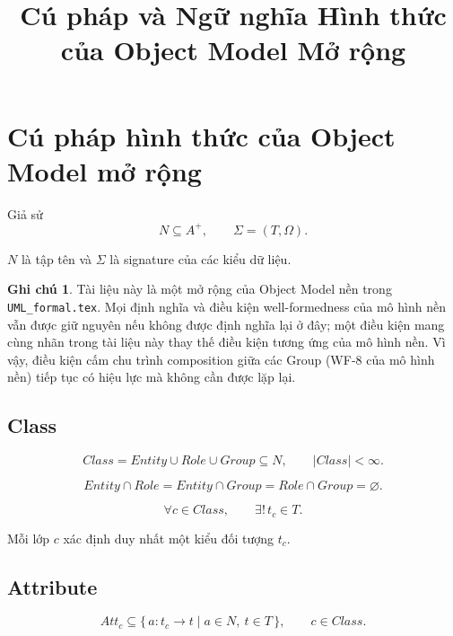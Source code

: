 \documentclass[12pt,a4paper]{article}
\title{Cú pháp và Ngữ nghĩa Hình thức của Object Model Mở rộng}
\date{}
\theoremstyle{definition}
\newtheorem*{ghichu}{Ghi chú}
\begin{document}
\maketitle


\section{Cú pháp hình thức của Object Model mở rộng}

Giả sử
\[
N\subseteq A^{+},
\qquad
\Sigma=(T,\Omega).
\]

$N$ là tập tên và $\Sigma$ là signature của các kiểu dữ liệu.

\begin{ghichu}
Tài liệu này là một mở rộng của Object Model nền trong
\texttt{UML\_formal.tex}. Mọi định nghĩa và điều kiện well-formedness của
mô hình nền vẫn được giữ nguyên nếu không được định nghĩa lại ở đây; một điều
kiện mang cùng nhãn trong tài liệu này thay thế điều kiện tương ứng của mô hình
nền. Vì vậy, điều kiện cấm chu trình composition giữa các Group (WF-8 của mô
hình nền) tiếp tục có hiệu lực mà không cần được lặp lại.
\end{ghichu}


\subsection{Class}

\[
Class = Entity\cup Role\cup Group\subseteq N,
\qquad
|Class|<\infty.
\]


\[
Entity\cap Role
=
Entity\cap Group
=
Role\cap Group
=
\varnothing.
\]


\[
\forall c\in Class,\qquad
\exists!\,t_c\in T.
\]

Mỗi lớp $c$ xác định duy nhất một kiểu đối tượng $t_c$.


\subsection{Attribute}

\[
Att_c
\subseteq
\{\,a:t_c\to t\mid a\in N,\ t\in T\,\},
\qquad c\in Class.
\]
\end{document}

